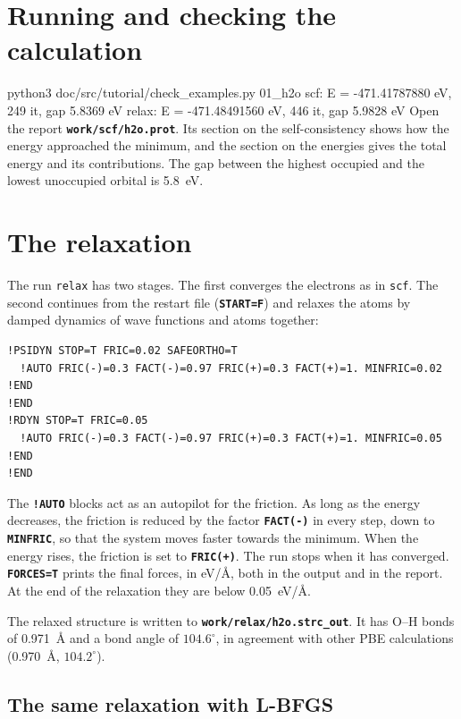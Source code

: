 \documentclass[11pt,a4paper,oneside]{book}
\newcommand{\key}[1]{\textbf{\texttt{#1}}}
\newcommand{\file}[1]{\textbf{\texttt{#1}}}
\newenvironment{shell}{\small\verbatim}{\endverbatim}
\begin{document}
\section{Running and checking the calculation}

\begin{shell}
python3 doc/src/tutorial/check_examples.py 01_h2o
    scf: E = -471.41787880 eV, 249 it, gap 5.8369 eV
    relax: E = -471.48491560 eV, 446 it, gap 5.9828 eV
\end{shell}
Open the report \file{work/scf/h2o.prot}. Its section on the
self-consistency shows how the energy approached the minimum, and the
section on the energies gives the total energy and its contributions.
The gap between the highest occupied and the lowest unoccupied orbital
is 5.8~eV.

\section{The relaxation}

The run \texttt{relax} has two stages. The first converges the
electrons as in \texttt{scf}. The second continues from the restart
file (\key{START=F}) and relaxes the atoms by damped dynamics of wave
functions and atoms together:
\begin{verbatim}
!PSIDYN STOP=T FRIC=0.02 SAFEORTHO=T
  !AUTO FRIC(-)=0.3 FACT(-)=0.97 FRIC(+)=0.3 FACT(+)=1. MINFRIC=0.02 !END
!END
!RDYN STOP=T FRIC=0.05
  !AUTO FRIC(-)=0.3 FACT(-)=0.97 FRIC(+)=0.3 FACT(+)=1. MINFRIC=0.05 !END
!END
\end{verbatim}
The \key{!AUTO} blocks act as an autopilot for the friction. As long as
the energy decreases, the friction is reduced by the factor
\key{FACT(-)} in every step, down to \key{MINFRIC}, so that the system
moves faster towards the minimum. When the energy rises, the friction
is set to \key{FRIC(+)}. The run stops when it has converged.
\key{FORCES=T} prints the final forces, in eV/\AA, both in the output
and in the report. At the end of the relaxation they are below
0.05~eV/\AA.

The relaxed structure is written to \file{work/relax/h2o.strc\_out}. It
has O--H bonds of 0.971~\AA{} and a bond angle of $104.6^\circ$, in
agreement with other PBE calculations (0.970~\AA, $104.2^\circ$).

\subsection*{The same relaxation with L-BFGS}
\end{document}
